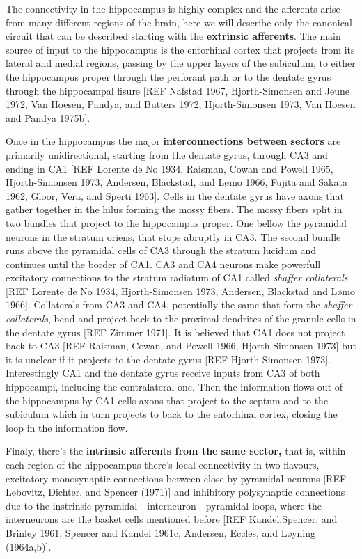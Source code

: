 The connectivity in the hippocampus is highly complex and the afferents arise from many different regions of the brain, here we will describe only the canonical circuit that can be described starting with the \textbf{extrinsic afferents}. 
The main source of input to the hippocampus is the entorhinal cortex that projects from its lateral and medial regions, passing by the upper layers of the subiculum, to either the hippocampus proper through the perforant path or to the dentate gyrus through the hippocampal fisure [REF Nafstad 1967, Hjorth-Simonsen and Jeune 1972, Van Hoesen, Pandya, and Butters 1972, Hjorth-Simonsen 1973, Van Hoesen and Pandya 1975b].

Once in the hippocampus the major \textbf{interconnections between sectors} are primarily unidirectional, starting from the dentate gyrus, through CA3 and ending in CA1 [REF Lorente de No 1934, Raisman, Cowan and Powell 1965, Hjorth-Simonsen 1973, Andersen, Blackstad, and Lømo 1966, Fujita and Sakata 1962, Gloor, Vera, and Sperti 1963].   
Cells in the dentate gyrus have axons that gather together in the hilus forming the mossy fibers. The mossy fibers split in two bundles that project to the hippocampus proper. 
One bellow the pyramidal neurons in the stratum oriens, that stops abruptly in CA3.
The second bundle runs above the pyramidal cells of CA3 through the stratum lucidum and continues until the border of CA1.
CA3 and CA4 neurons make powerfull excitatory connections to the stratum radiatum of CA1 called \textit{shaffer collaterals} [REF Lorente de No 1934, Hjorth-Simonsen 1973, Andersen, Blackstad and Lømo 1966]. 
Collaterals from CA3 and CA4, potentially the same that form the \textit{shaffer collaterals}, bend and project back to the proximal dendrites of the granule cells in the dentate gyrus [REF Zimmer 1971].
It is believed that CA1 does not project back to CA3 [REF Raisman, Cowan, and Powell 1966, Hjorth-Simonsen 1973] but it is unclear if it projects to the dentate gyrus [REF Hjorth-Simonsen 1973].
Interestingly CA1 and the dentate gyrus receive inputs from CA3 of both hippocampi, including the contralateral one.
Then the information flows out of the hippocampus by CA1 cells axons that project to the septum and to the subiculum which in turn projects to back to the entorhinal cortex, closing the loop in the information flow.

Finaly, there's the \textbf{intrinsic afferents from the same sector,} that is, within each region of the hippocampus there's local connectivity in two flavours, excitatory monosynaptic connections between close by pyramidal neurons [REF Lebovitz, Dichter, and Spencer (1971)] and inhibitory polysynaptic connections due to the instrinsic pyramidal - interneuron - pyramidal loops, where the interneurons are the basket cells mentioned before [REF Kandel,Spencer, and Brinley 1961, Spencer and Kandel 1961c, Andersen, Eccles, and Løyning (1964a,b)].

